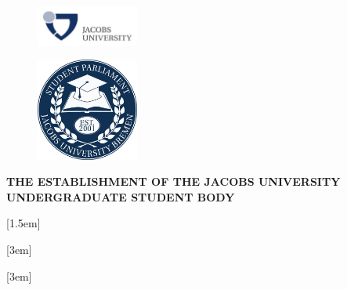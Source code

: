 \documentclass[12pt]{constitution}
\begin{document}


\begin{figure}[H]
    \centering
    \includegraphics[width=0.3\textwidth, right]{../misc/jacobs.png}
\end{figure}

\begin{figure}[H]
    \centering
    \includegraphics[width=0.3\textwidth]{../misc/usg.jpg}
\end{figure}

\begin{center}
\textbf{\Large{THE ESTABLISHMENT OF THE JACOBS UNIVERSITY\\
UNDERGRADUATE STUDENT BODY}}
\end{center}

\begingroup
\let\clearpage\relax
\setcounter{tocdepth}{3}

\makeatletter
\def\toclevel@part{0}
\def\toclevel@article{1}
[1.5em] {\bfseries} {\contentslabel{2.8em}} {\hspace*{-2.3em}} {\contentspage}
\def\toclevel@section{2}
[3em] {\normalfont} {\contentslabel{2.3em}} {\hspace*{-2.3em}} {\contentspage}
\def\toclevel@sectionstar{2}
[3em] {\normalfont} {\contentslabel{2.3em}} {\hspace*{-2.3em}} {\contentspage}
\makeatother

\renewcommand{\contentsname}{\centering Table of Contents}
\end{document}
